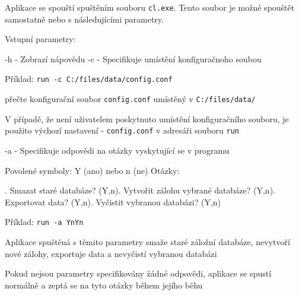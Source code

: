 Aplikace se spouští spuštěním souboru \texttt{cl.exe}. Tento soubor je možné spouštět samostatně nebo s následujícími parametry.

Vstupní parametry:

\setlength{\leftskip}{1cm}

\noindent
-h \hspace{0.5cm} - \hspace{0.5cm} Zobrazí nápovědu\newline
-c \hspace{0.5cm} - \hspace{0.5cm} Specifikuje umístění konfiguračnoho soubou

\hspace{0.5cm}Příklad: \hspace{0.5cm} \texttt{run -c C:/files/data/config.conf}

\hspace{0.5cm}přečte konfigurační soubor \texttt{config.conf} umístěný v \texttt{C:/files/data/}

\setlength{\leftskip}{2cm}

V případě, že není uživatelem poskytnuto umístění konfiguračního souboru, je použito výchozí nastavení - \texttt{config.conf} v adresáři souboru \texttt{run}

\setlength{\leftskip}{1cm}
\noindent
-a \hspace{0.5cm} - \hspace{0.5cm} Specifikuje odpovědi na otázky vyskytující se v programu

\setlength{\leftskip}{2cm}
\noindent
Povolené symboly: Y (ano) nebo n (ne)
\newline\noindent
Otázky:

\setlength{\leftskip}{3cm}
. Smazat staré databáze? (Y,n). Vytvořit zálohu vybrané databáze? (Y,n). Exportovat data? (Y,n). Vyčistit vybranou databázi? (Y,n)\newline

\setlength{\leftskip}{2cm}
\noindent
Příklad: \hspace{0.5cm} \texttt{run -a YnYn}

\noindent    
Aplikace spuštěná s těmito parametry smaže staré záložní databáze, nevytvoří nové zálohy, exportuje data a nevyčistí vybranou databázi           

\noindent
Pokud nejsou parametry specifikovány žádné odpovědi, aplikace se spustí normálně a zeptá se na tyto otázky během jejího běhu

